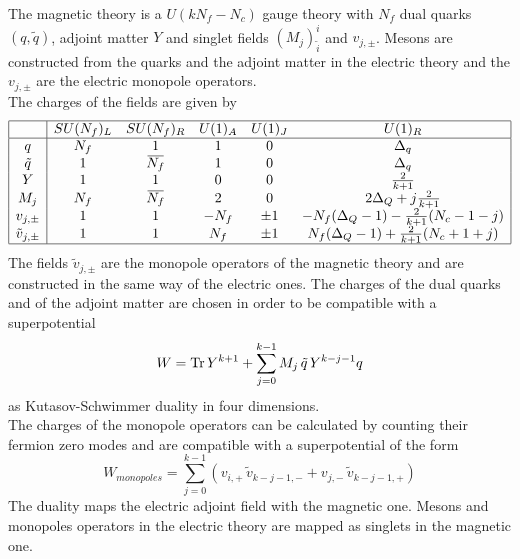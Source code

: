 The magnetic theory is a $U(k N_f - N_c)$ gauge theory with $N_f$ dual quarks $(q,\tilde{q})$, adjoint matter $Y$ and singlet fields $(M_j)^{i}_{\tilde{i}}$ and $v_{j,\pm}$. Mesons are constructed from the quarks and the adjoint matter in the electric theory and the $v_{j,\pm}$ are the electric monopole operators.\\
The charges of the fields are given by
\begin{equation}
\begin{array}{ | c | c c c c c | } 
 \hline
  & SU(N_f)_L & SU(N_f)_R & U(1)_A & U(1)_J  & U(1)_R   \\
 \hline
 q & N_f & 1& 1 & 0   & \Delta_q  \\  
 \tilde{q} & 1 & \overbar{N_f} & 1 & 0 & \Delta_q      \\  
  Y & 1 & 1  & 0 & 0 & \frac{2}{k+1}  \\ 
  M_j & N_f & \overbar{N_f} & 2  &  0& 2 \Delta_Q + j \frac{2}{k+1} \\
  v_{j,\pm} & 1  &1   & - N_f & \pm 1 & -N_f (\Delta_Q-1 ) - \frac{2}{k+1} (N_c-1 - j) \\
 \tilde{v}_{j,\pm} & 1  &1   & N_f & \pm 1 & N_f (\Delta_Q-1 ) + \frac{2}{k+1} (N_c + 1 + j) \\
 \hline
\end{array}
\label{tab:kim-park-magnetic}
\end{equation}
The fields $\tilde{v}_{j,\pm}$ are the monopole operators of the magnetic theory and are constructed in the same way of the electric ones.
The charges of the dual quarks and of the adjoint matter are chosen in order to be compatible with a superpotential 
\begin{equation}
W = \mathrm{Tr } \,{ Y^{k+1}} + \sum_{j=0}^{k-1} M_j \, \tilde{q}\, Y^{k - j - 1} q 
\end{equation}
as Kutasov-Schwimmer duality in four dimensions.\\
The charges of the monopole operators can be calculated by counting their fermion zero modes and are compatible with a superpotential of the form
\begin{equation}
W_{monopoles} = \sum_{j=0}^{k-1} \left(   v_{i,+} \, \tilde{v}_{k-j-1,-} + v_{j,-} \, \tilde{v}_{k-j-1,+} \right)
\label{eqn:kimpark_superpotential_monopoles}
\end{equation}
The duality maps the electric adjoint field with the magnetic one.
Mesons and monopoles operators in the electric theory are mapped as singlets in the magnetic one. 